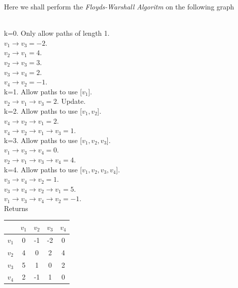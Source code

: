 \documentclass[11pt,a4paper]{article}
\begin{document}
Here we shall perform the \textit{Floyds-Warshall Algoritm} on the following graph\\
\\
k=0. Only allow paths of length 1.\\
$v_1\to v_3=-2$.\\
$v_2\to v_1=4$.\\
$v_2\to v_3=3$.\\
$v_3\to v_4=2$.\\
$v_4\to v_2=-1$.\\
k=1. Allow paths to use $[v_1$].\\
$v_2\to v_1\to v_3=2$. Update.\\
k=2. Allow paths to use $[v_1,v_2$].\\
$v_4\to v_2\to v_1=2$.\\
$v_4\to v_2\to v_1\to v_3=1$.\\
k=3. Allow paths to use $[v_1,v_2,v_3$].\\
$v_1\to v_3\to v_4=0$.\\
$v_2\to v_1\to v_3\to v_4=4$.\\
k=4. Allow paths to use $[v_1,v_2,v_3,v_4$].\\
$v_3\to v_4\to v_2=1$.\\
$v_3\to v_4\to v_2\to v_1=5$.\\
$v_1\to v_3\to v_4\to v_2=-1$.\\
Returns
\begin{tabular}{|c|c|c|c|c|}
\hline
&$v_1$&$v_2$&$v_3$&$v_4$\\
\hline
$v_1$&0&-1&-2&0\\
\hline
$v_2$&4&0&2&4\\
\hline
$v_3$&5&1&0&2\\
\hline
$v_4$&2&-1&1&0\\
\hline
\end{tabular}\\
\end{document}
